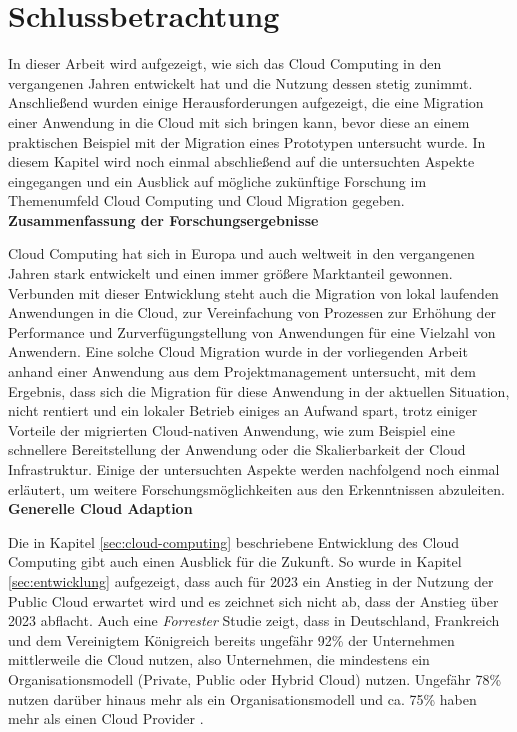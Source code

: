 \chapter{Schlussbetrachtung}
\label{chap:schlussbetrachtung}
In dieser Arbeit wird aufgezeigt, wie sich das Cloud Computing in den vergangenen Jahren entwickelt hat und die Nutzung dessen stetig zunimmt. Anschließend wurden einige Herausforderungen aufgezeigt, die eine Migration einer Anwendung in die Cloud mit sich bringen kann, bevor diese an einem praktischen Beispiel mit der Migration eines Prototypen untersucht wurde. In diesem Kapitel wird noch einmal abschließend auf die untersuchten Aspekte eingegangen und ein Ausblick auf mögliche zukünftige Forschung im Themenumfeld Cloud Computing und Cloud Migration gegeben. \\

\textbf{Zusammenfassung der Forschungsergebnisse}

Cloud Computing hat sich in Europa und auch weltweit in den vergangenen Jahren stark entwickelt und einen immer größere Marktanteil gewonnen. Verbunden mit dieser Entwicklung steht auch die Migration von lokal laufenden Anwendungen in die Cloud, zur Vereinfachung von Prozessen zur Erhöhung der Performance und Zurverfügungstellung von Anwendungen für eine Vielzahl von Anwendern. Eine solche Cloud Migration wurde in der vorliegenden Arbeit anhand einer Anwendung aus dem Projektmanagement untersucht, mit dem Ergebnis, dass sich die Migration für diese Anwendung in der aktuellen Situation, nicht rentiert und ein lokaler Betrieb einiges an Aufwand spart, trotz einiger Vorteile der migrierten Cloud-nativen Anwendung, wie zum Beispiel eine schnellere Bereitstellung der Anwendung oder die Skalierbarkeit der Cloud Infrastruktur. Einige der untersuchten Aspekte werden nachfolgend noch einmal erläutert, um weitere Forschungsmöglichkeiten aus den Erkenntnissen abzuleiten. \\

\textbf{Generelle Cloud Adaption}

Die in Kapitel \ref{sec:cloud-computing} beschriebene Entwicklung des Cloud Computing gibt auch einen Ausblick für die Zukunft. So wurde in Kapitel \ref{sec:entwicklung} aufgezeigt, dass auch für 2023 ein Anstieg in der Nutzung der Public Cloud erwartet wird und es zeichnet sich nicht ab, dass der Anstieg über 2023 abflacht. Auch eine \textit{Forrester} Studie zeigt, dass in Deutschland, Frankreich und dem Vereinigtem Königreich bereits ungefähr 92\% der Unternehmen mittlerweile die Cloud nutzen, also Unternehmen, die mindestens ein Organisationsmodell (Private, Public oder Hybrid Cloud) nutzen. Ungefähr 78\% nutzen darüber hinaus mehr als ein Organisationsmodell und ca. 75\% haben mehr als einen Cloud Provider \cite[Vgl.][S. 4]{Rajamani2022}. \pagebreak

